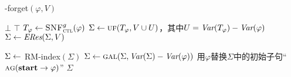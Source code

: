 \begin{algorithm}[tb]
	\caption{{\CTL-forget}$(\varphi, V)$}
	\label{alg:compute:forgetting:by:Resolution}
	\lIf{$\varphi\equiv\bot$} {{\bf \Return $\bot$}}    
	 {{\bf \Return  $\top$}}   
	$T_\varphi \leftarrow {\textsc{SNF}_{\textsc{ctl}}^g}(\varphi)$ 
	$\Sigma\leftarrow \textsc{uf}(T_\varphi,V\cup U)$，其中$U=\textit{Var}(T_\varphi)-\textit{Var}(\varphi)$
	$\Sigma\leftarrow \emph{ERes}(\Sigma,V)$ 
	
	$\Sigma\leftarrow$ {RM-index}$(\Sigma)$ 
	$\Sigma\leftarrow \textsc{gal}(\Sigma,\textit{Var}(\Sigma)-\textit{Var}(\varphi))$ 
	用$\varphi$替换$\Sigma$中的初始子句“$\textsc{a}\textsc{g}(\textbf{start}\rightarrow\varphi)$”\;
	\Return $\Sigma$\;
\end{algorithm}




